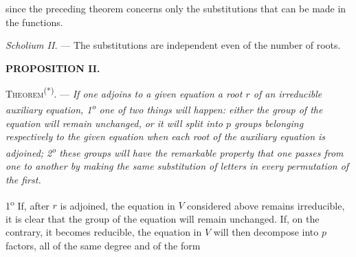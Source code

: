 
since the preceding theorem concerns only the substitutions that can be made
in the functions.

\emph{Scholium II.} --- The substitutions are independent even of the number of
roots.

\begin{center}{\bfseries PROPOSITION II.}\end{center}

\noindent\textsc{Theorem}\textsuperscript{(*)}. --- \emph{If one adjoins to a given equation a
root $r$ of an irreducible auxiliary equation, 1\textsuperscript{o} one of two things will
happen: either the group of the equation will remain unchanged, or it will
split into $p$ groups belonging respectively to the given equation when each
root of the auxiliary equation is adjoined; 2\textsuperscript{o} these groups will have the
remarkable property that one passes from one to another by making the same
substitution of letters in every permutation of the first.}



1\textsuperscript{o} If, after $r$ is adjoined, the equation in $V$ considered above
remains irreducible, it is clear that the group of the equation will remain
unchanged. If, on the contrary, it becomes reducible, the equation in $V$ will
then decompose into $p$ factors, all of the same degree and of the form

